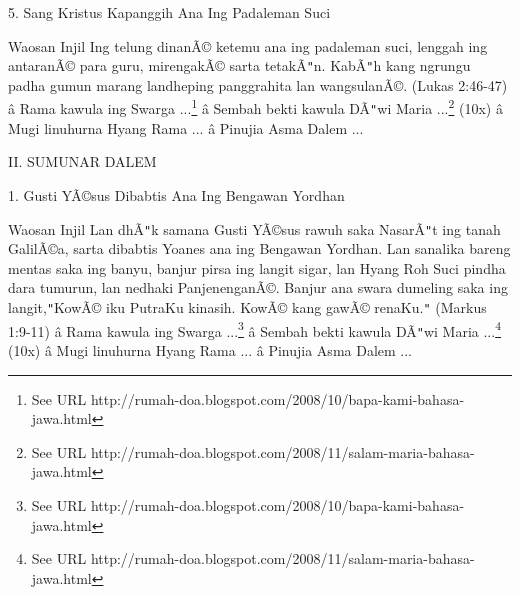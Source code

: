 
5. Sang Kristus Kapanggih Ana Ing Padaleman Suci

\newline


Waosan Injil
Ing telung dinan\~A\copyright{} ketemu ana ing padaleman suci, lenggah ing antaran\~A\copyright{} para guru, mirengak\~A\copyright{} sarta tetak\~A\texttt{{}"{}}n. Kab\~A\texttt{{}"{}}h kang ngrungu padha gumun marang landheping panggrahita lan wangsulan\~A\copyright{}. (Lukas 2:46-47)
\newline
 \^a\*  Rama kawula ing Swarga ...\footnote{See URL http://rumah-doa.blogspot.com/2008/10/bapa-kami-bahasa-jawa.html}\newline
 \^a\*  Sembah bekti kawula D\~A\texttt{{}"{}}wi Maria ...\footnote{See URL http://rumah-doa.blogspot.com/2008/11/salam-maria-bahasa-jawa.html} (10x)\newline
 \^a\*  Mugi linuhurna Hyang Rama ...\newline
 \^a\*  Pinujia Asma Dalem ...\newline

II. SUMUNAR DALEM
\newline


1. Gusti Y\~A\copyright{}sus Dibabtis Ana Ing Bengawan Yordhan

\newline


Waosan Injil
Lan dh\~A\texttt{{}"{}}k samana Gusti Y\~A\copyright{}sus rawuh saka Nasar\~A\texttt{{}"{}}t ing tanah Galil\~A\copyright{}a, sarta dibabtis Yoanes ana ing Bengawan Yordhan. Lan sanalika bareng mentas saka ing banyu, banjur pirsa ing langit sigar, lan Hyang Roh Suci pindha dara tumurun, lan nedhaki Panjenengan\~A\copyright{}. Banjur ana swara dumeling saka ing langit,\texttt{{}"{}}Kow\~A\copyright{} iku PutraKu kinasih. Kow\~A\copyright{} kang gaw\~A\copyright{} renaKu.\texttt{{}"{}} (Markus 1:9-11)
\newline
 \^a\*  Rama kawula ing Swarga ...\footnote{See URL http://rumah-doa.blogspot.com/2008/10/bapa-kami-bahasa-jawa.html}\newline
 \^a\*  Sembah bekti kawula D\~A\texttt{{}"{}}wi Maria ...\footnote{See URL http://rumah-doa.blogspot.com/2008/11/salam-maria-bahasa-jawa.html} (10x)\newline
 \^a\*  Mugi linuhurna Hyang Rama ...\newline
 \^a\*  Pinujia Asma Dalem ...\newline

